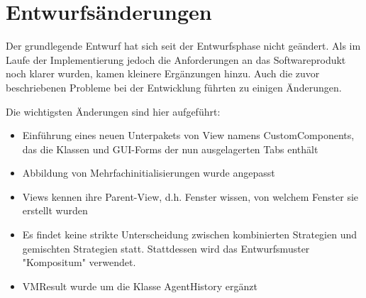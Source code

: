 \section{Entwurfsänderungen}

Der grundlegende Entwurf hat sich seit der Entwurfsphase nicht geändert. Als im Laufe der Implementierung jedoch die Anforderungen an das Softwareprodukt noch klarer wurden, kamen kleinere Ergänzungen hinzu. Auch die zuvor beschriebenen Probleme bei der Entwicklung führten zu einigen Änderungen.

Die wichtigsten Änderungen sind hier aufgeführt:

\begin{itemize}
\item Einführung eines neuen Unterpakets von View namens CustomComponents, das die Klassen und GUI-Forms der nun ausgelagerten Tabs enthält

\item Abbildung von Mehrfachinitialisierungen wurde angepasst

\item Views kennen ihre Parent-View, d.h. Fenster wissen, von welchem Fenster sie erstellt wurden

\item Es findet keine strikte Unterscheidung zwischen kombinierten Strategien und gemischten Strategien statt. Stattdessen wird das Entwurfsmuster "Kompositum" verwendet.

\item VMResult wurde um die Klasse AgentHistory ergänzt

\end{itemize}

